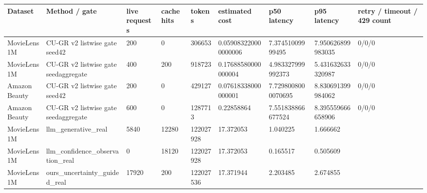 \begin{tabular}{lllllllll}
\toprule
Dataset & Method / gate & live requests & cache hits & tokens & estimated cost & p50 latency & p95 latency & retry / timeout / 429 count \\
\midrule
MovieLens 1M & CU-GR v2 listwise gate seed42 & 200 & 0 & 306653 & 0.059083220000000006 & 7.37451009999495 & 7.950626899983035 & 0/0/0 \\
MovieLens 1M & CU-GR v2 listwise gate seedaggregate & 400 & 200 & 918723 & 0.17688580000000004 & 4.983327999992373 & 5.431632633320987 & 0/0/0 \\
Amazon Beauty & CU-GR v2 listwise gate seed42 & 200 & 0 & 429127 & 0.07618338000000001 & 7.7298008000070695 & 8.830691399984062 & 0/0/0 \\
Amazon Beauty & CU-GR v2 listwise gate seedaggregate & 600 & 0 & 1287713 & 0.22858864 & 7.551838866677524 & 8.395559666658906 & 0/0/0 \\
MovieLens 1M & llm\_generative\_real & 5840 & 12280 & 122027928 & 17.372053 & 1.040225 & 1.666662 &  \\
MovieLens 1M & llm\_confidence\_observation\_real & 0 & 18120 & 122027928 & 17.372053 & 0.165517 & 0.505609 &  \\
MovieLens 1M & ours\_uncertainty\_guided\_real & 17920 & 200 & 122027536 & 17.371944 & 2.203485 & 2.674855 &  \\
\bottomrule
\end{tabular}
